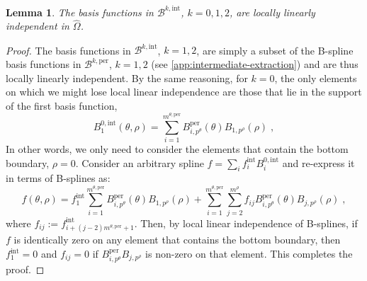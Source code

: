 \documentclass[10pt]{article}
\newcommand{\mbf}[1]{{\boldsymbol{#1}}}
\newcommand{\basis}[1]{\mathcal{#1}}
\newcommand{\tpDomain}{\widehat{\Omega}}
\newcommand{\cU}{\theta}
\newcommand{\cV}{\rho}
\newcommand{\degU}{p^\cU}
\newcommand{\degV}{p^\cV}
\newcommand{\kntU}{\cU}
\newcommand{\kntV}{\cV}
\newcommand{\kntsU}{\mbf{\kntU}}
\newcommand{\kntsV}{\mbf{\kntV}}
\newcommand{\ndofV}{m^\cV}
\newcommand{\bsp}{B}
\newcommand{\bspB}{\basis{\bsp}}
\newcommand{\tpB}[2]{\bspB^{#1}}
\newcommand{\per}{\mathrm{per}}
\newcommand{\pndofU}{m^{\cU,\per}}
\newcommand{\tint}{\mathrm{int}}
\theoremstyle{plain}
\newtheorem{lemma}{Lemma}[section]
\theoremstyle{definition}
\theoremstyle{remark}
\begin{document}
\begin{lemma}\label{lem:local-linear-independence-intermediate}
    The basis functions in $\bspB^{k,\tint}$, $k = 0, 1, 2$, are locally linearly independent in $\tpDomain$.
\end{lemma}
\begin{proof}
    The basis functions in $\bspB^{k,\tint}$, $k = 1, 2$, are simply a subset of the B-spline basis functions in $\tpB{k,\per}{\kntsU,\kntsV}$, $k = 1, 2$ (see \cref{app:intermediate-extraction}) and are thus locally linearly independent.
    By the same reasoning, for $k = 0$, the only elements on which we might lose local linear independence are those that lie in the support of the first basis function,
    \begin{equation*}
        \bsp^{0,\tint}_{1}(\cU,\cV) = \sum_{i=1}^{\pndofU} \bsp^{\per}_{i,\degU}(\cU) \bsp_{1,\degV}(\cV)\;,
    \end{equation*}
    In other words, we only need to consider the elements that contain the bottom boundary, $\cV = 0$.
    Consider an arbitrary spline $f = \sum_{i} f_i^\tint \bsp^{0,\tint}_{i}$ and re-express it in terms of B-splines as:
    \begin{equation*}
        f(\cU,\cV) = f_1^\tint\sum_{i=1}^{\pndofU}\bsp^{\per}_{i,\degU}(\cU) \bsp_{1,\degV}(\cV) + \sum_{i=1}^{\pndofU}\sum_{j=2}^{\ndofV} f_{ij} \bsp^{\per}_{i,\degU}(\cU) \bsp_{j,\degV}(\cV)\;,
    \end{equation*}
    where $f_{ij} := f^\tint_{i + (j-2)\pndofU + 1 }$.
    Then, by local linear independence of B-splines, if $f$ is identically zero on any element that contains the bottom boundary, then $f_1^\tint = 0$ and $f_{ij} = 0$ if $\bsp^{\per}_{i,\degU}\bsp_{j,\degV}$ is non-zero on that element.
    This completes the proof.
\end{proof}
\end{document}
